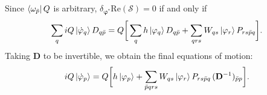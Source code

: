 \documentclass[aip,jcp,preprint,superscriptaddress,nofootinbib]{revtex4-1}
\begin{document}
Since $\bra{\omega_{\bar{p}}} Q$ is arbitrary, $\delta_{\bm{\varphi}^*} \mathrm{Re}(\mathcal{S}) = 0$
if and only if
\begin{align}
    \sum_{q} i Q \ket{\dot{\varphi}_{q}} D_{q\bar{p}} 
    = Q \bigg[ \sum_{q} h \ket{\varphi_{q}} D_{q\bar{p}}
    + \sum_{qrs} W_{qs} \ket{\varphi_{r}} P_{rs\bar{p}q} \bigg].
\end{align}
Taking $\mathbf{D}$ to be invertible, we obtain the final equations of motion:
\begin{align}
    i Q \ket{\dot{\varphi}_{p}}
    = Q \bigg[ h \ket{\varphi_{p}}
    + \sum_{\bar{p}qrs} W_{qs} \ket{\varphi_{r}} P_{rs\bar{p}q} \, (\mathbf{D}^{-1})_{\bar{p} p} \bigg].
\end{align}

\end{document}
